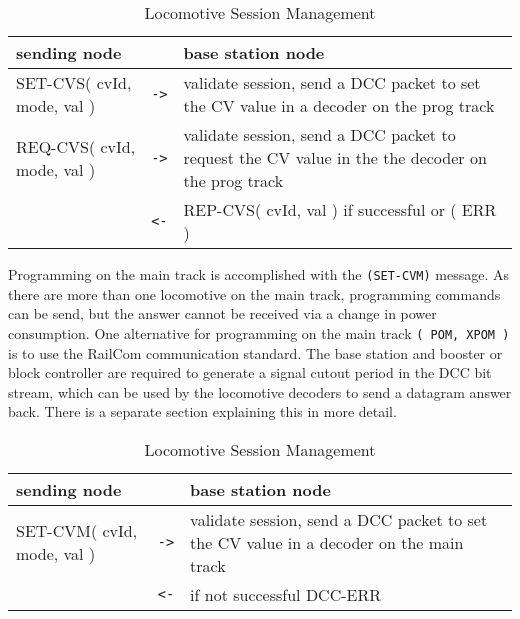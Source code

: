 \begin{table}[ht!]
    \begin{center}
        \caption{Locomotive Session Management}
        \begin{tabular}{|p{} c p{}|}
            \toprule
            \textbf{sending node} & & \textbf{ base station node} \\
            \midrule
            SET-CVS( cvId, mode, val ) & \texttt{->} & validate session, send a DCC packet to set the CV value in a decoder on the prog track \\
            \midrule
            REQ-CVS( cvId, mode, val ) & \texttt{->} & validate session, send a DCC packet to request the CV value in the the decoder on the prog track \\
            & \texttt{<-} & REP-CVS( cvId, val ) if successful or ( ERR ) \\ 
            \bottomrule
        \end{tabular}
    \end{center}
\end{table}

Programming on the main track is accomplished with the \texttt{(SET-CVM)} message. As there are more than one locomotive on the main track, programming commands can be send, but the answer cannot be received via a change in power consumption. One alternative for programming on the main track \texttt{( POM, XPOM )} is to use the RailCom communication standard. The base station and booster or block controller are required to generate a signal cutout period in the DCC bit stream, which can be used by the locomotive decoders to send a datagram answer back. There is a separate section explaining this in more detail.

\begin{table}[ht!]
    \begin{center}
        \caption{Locomotive Session Management}
        \begin{tabular}{|p{} c p{}|}
            \toprule
            \textbf{sending node} & & \textbf{ base station node} \\
            \midrule
            SET-CVM( cvId, mode, val ) & \texttt{->} & validate session, send a DCC packet to set the CV value in a decoder on the main track \\
            & \texttt{<-} & if not successful DCC-ERR \\
            \bottomrule
        \end{tabular}
    \end{center}
\end{table}

